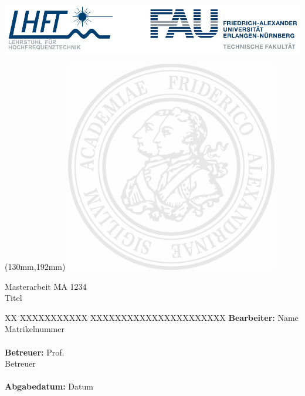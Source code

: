 \thispagestyle{empty}
\setcounter{page}{-1}

\includegraphics*[width = \textwidth]{bilder/LHFT_FAU_Logo}

\begin{textblock*}{93mm}(130mm,192mm)
\includegraphics[width=93mm]{bilder/fausiegel}
\end{textblock*}

\vspace{51mm}

{\centering

\large{Masterarbeit MA 1234} \\
\Large{Titel}

\par}

\vspace{65mm}

{\raggedright
\begin{tabbing}
XX \= XXXXXXXXXXX \= XXXXXXXXXXXXXXXXXXXXXX \kill
		\> \textbf{Bearbeiter:} 	\> Name 						\\
		\>							\> Matrikelnummer							\\
 		\>							\>									\\
		\> \textbf{Betreuer:}		\> Prof. 	\\
		\>							\> Betreuer			\\
		\>							\> 									\\
		\> \textbf{Abgabedatum:}	\> Datum
\end{tabbing}
\par}

\newpage
\thispagestyle{empty}

\cleardoublepage

